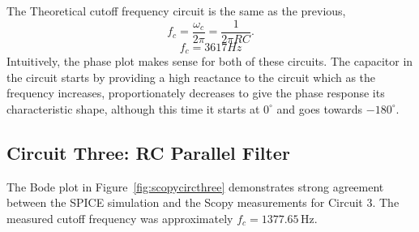 \documentclass[12pt]{article}
\begin{document}
The Theoretical cutoff frequency circuit is the same as the previous,\[
	f_c = \frac{\omega_c}{2\pi} = \frac{1}{2\pi RC}.
\]
\[
	f_c = 3617Hz
\]
Intuitively, the phase plot makes sense for both of these circuits. The
capacitor in the circuit starts by providing a high reactance to the circuit
which as the frequency increases, proportionately decreases to give the
phase response its characteristic shape, although this time it starts at
$0^\circ$ and goes towards $-180^\circ$.

\subsection{Circuit Three: RC Parallel Filter}

The Bode plot in Figure~\ref{fig:scopycircthree} demonstrates strong agreement
between the SPICE simulation and the Scopy measurements for Circuit 3. The
measured cutoff frequency was approximately $f_c = 1377.65\,\mathrm{Hz}$.
\end{document}
